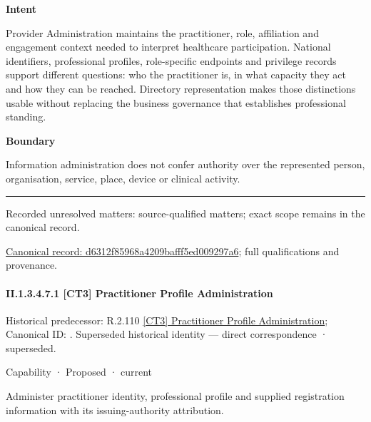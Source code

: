 \textbf{Intent}



Provider Administration maintains the practitioner, role, affiliation and engagement context needed to interpret healthcare participation. National identifiers, professional profiles, role-specific endpoints and privilege records support different questions: who the practitioner is, in what capacity they act and how they can be reached. Directory representation makes those distinctions usable without replacing the business governance that establishes professional standing.



\textbf{Boundary}



Information administration does not confer authority over the represented person, organisation, service, place, device or clinical activity.



\medskip\hrule\medskip

{\small Recorded unresolved matters: source-qualified matters; exact scope remains in the canonical record.}\par
{\footnotesize \href{../../../../../../../continuum/strategy/capability/d6312f85968a4209bafff5ed009297a6.md}{Canonical record: d6312f85968a4209bafff5ed009297a6}; full qualifications and provenance.}\par
\paragraph*{II.1.3.4.7.1 [CT3] Practitioner Profile Administration}
\label{navigation:II.1.3.4.7.1}

{\small Historical predecessor: R.2.110 \hyperref[element:2415ddcbc73c47e1a63be310bd4342ee]{[CT3] Practitioner Profile Administration}; Canonical ID: \texttt{}. Superseded historical identity — direct correspondence · superseded.}\par
\label{element:40759a835f7b456e9257c38b67b0a380}
{\small Capability · Proposed · current}\par

Administer practitioner identity, professional profile and supplied registration information with its issuing-authority attribution.



